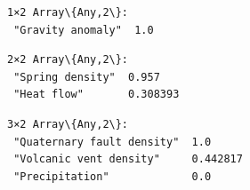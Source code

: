 \documentclass[11pt]{article}
\begin{document}
    
    
    \begin{Verbatim}[commandchars=\\\{\}]
1×2 Array\{Any,2\}:
 "Gravity anomaly"  1.0
    \end{Verbatim}

    
    
    \begin{Verbatim}[commandchars=\\\{\}]
2×2 Array\{Any,2\}:
 "Spring density"  0.957
 "Heat flow"       0.308393
    \end{Verbatim}

    
    
    \begin{Verbatim}[commandchars=\\\{\}]
3×2 Array\{Any,2\}:
 "Quaternary fault density"  1.0
 "Volcanic vent density"     0.442817
 "Precipitation"             0.0
    \end{Verbatim}

    
    \begin{center}
    \end{center}
    { \hspace*{\fill} \\}
    
\end{document}
